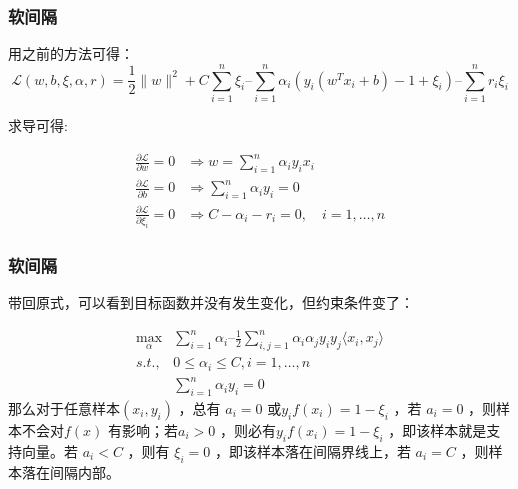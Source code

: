 \begin{frame}
\frametitle{软间隔}

用之前的方法可得：
\[
\mathcal{L}(w,b,\xi,\alpha,r)=\frac{1}{2}\|w\|^2 + C\sum_{i=1}^n\xi_i – \sum_{i=1}^n\alpha_i \left(y_i(w^Tx_i+b)-1+\xi_i\right) – \sum_{i=1}^n r_i\xi_i
\]

求导可得:

\begin{align*}
\frac{\partial \mathcal{L}}{\partial w}=0 &\Rightarrow w=\sum_{i=1}^n \alpha_i y_i x_i \\
\frac{\partial \mathcal{L}}{\partial b} = 0 &\Rightarrow \sum_{i=1}^n \alpha_i y_i = 0 \\
\frac{\partial \mathcal{L}}{\partial \xi_i} = 0 &\Rightarrow C-\alpha_i-r_i=0, \quad i=1,\ldots,n 
\end{align*}

\end{frame}


\begin{frame}
\frametitle{软间隔}

带回原式，可以看到目标函数并没有发生变化，但约束条件变了：

\begin{align*}
\max_\alpha &\sum_{i=1}^n\alpha_i – \frac{1}{2}\sum_{i,j=1}^n\alpha_i\alpha_jy_iy_j\langle x_i,x_j\rangle \\
s.t., &0\leq \alpha_i\leq C, i=1,\ldots,n \\
&\sum_{i=1}^n\alpha_iy_i = 0
\end{align*}
那么对于任意样本$(x_i,y_i)$ ，总有 $a_i=0$ 或$ y_if(x_i) = 1-\xi_i$  ，若 $a_i=0$ ，则样本不会对$ f(x)$ 有影响；若$ a_i>0$ ，则必有$ y_if(x_i) = 1-\xi_i$ ，即该样本就是支持向量。若 $a_i<C$ ，则有 $\xi_i=0$ ，即该样本落在间隔界线上，若 $a_i=C$ ，则样本落在间隔内部。
\end{frame}